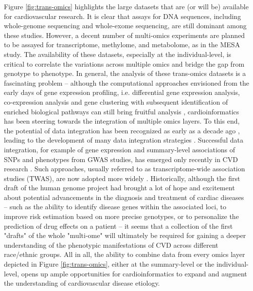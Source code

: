 \documentclass[letter]{bioinfo}
\begin{document}
	 Figure \ref{fig:trans-omics} highlights the large datasets that are (or will be) available for cardiovascular research. It is clear that assays for DNA sequences, including whole-genome sequencing and whole-exome sequencing, are still dominant among these studies. However, a decent number of multi-omics experiments are planned to be assayed for transcriptome, methylome, and metabolome, as in the MESA study. The availability of these datasets, especially at the individual-level, is critical to correlate the variations across multiple omics and bridge the gap from genotype to phenotype.  In general, the analysis of these trans-omics datasets is a fascinating problem -- although the computational approaches envisioned from the early days of gene expression profiling, i.e. differential gene expression analysis, co-expression analysis and gene clustering with subsequent identification of enriched biological pathways \citep{Claverie:1999:Computational} can still bring fruitful analysis \citep{Santolini:2018:personalized}, cardioinformatics has been steering towards the integration of multiple omics layers. To this end, the potential of data integration has been recognized as early as a decade ago \cite{Hawkins:2010:Nextgeneration}, leading to the development of many data integration strategies \citep{Ritchie:2015:Methods}. Successful data integration, for example of gene expression and summary-level associations of SNPs and phenotypes from GWAS studies, has emerged only recently in CVD research \citep{Gusev:2016:Integrative}. Such approaches, usually referred to as transcriptome-wide association studies (TWAS), are now adopted more widely \citep{Klarin:2018:Genetics}.  Historically, although the first draft of the human genome project had brought a lot of hope and excitement about potential advancements in the diagnosis and treatment of cardiac diseases -- such as the ability to identify disease genes within the associated loci, to improve risk estimation based on more precise genotypes, or to personalize the prediction of drug effects on a patient \citep{Komajda:2001:heart} -- it seems that a collection of the first "drafts" of the whole "multi-ome" will ultimately be required for gaining a deeper understanding of the phenotypic manifestations of CVD across different race/ethnic groups.  All in all, the ability to combine data from every omics layer depicted in Figure \ref{fig:trans-omics}, either at the summary-level or the individual-level, opens up ample opportunities for cardioinformatics to expand and augment the understanding of cardiovascular disease etiology.
	
\end{document}

